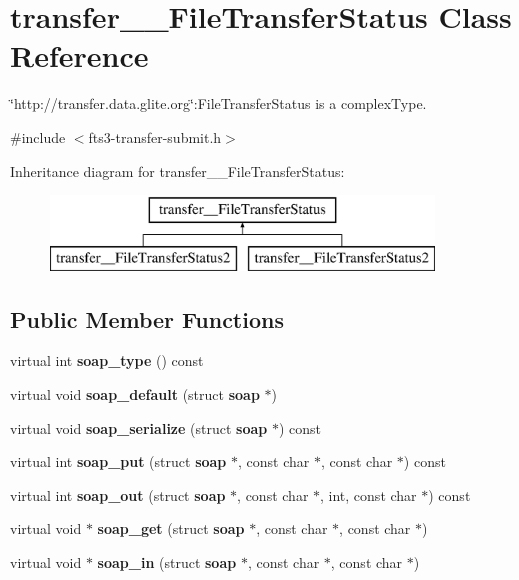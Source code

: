 \section{transfer\_\-\_\-FileTransferStatus Class Reference}
\label{classtransfer____FileTransferStatus}


\char`\"{}http://transfer.data.glite.org\char`\"{}:FileTransferStatus is a complexType.  




{\ttfamily \#include $<$fts3-\/transfer-\/submit.h$>$}

Inheritance diagram for transfer\_\-\_\-FileTransferStatus:\begin{figure}[H]
\begin{center}
\leavevmode
\includegraphics[height=2.000000cm]{classtransfer____FileTransferStatus}
\end{center}
\end{figure}
\subsection*{Public Member Functions}
\begin{DoxyCompactItemize}
\item 
virtual int {\bfseries soap\_\-type} () const \label{classtransfer____FileTransferStatus_a642ad3383ab927add4be60c6f333598a}

\item 
virtual void {\bfseries soap\_\-default} (struct {\bf soap} $\ast$)\label{classtransfer____FileTransferStatus_a888fcc282ac6ee23e00f9a5f8ee03a97}

\item 
virtual void {\bfseries soap\_\-serialize} (struct {\bf soap} $\ast$) const \label{classtransfer____FileTransferStatus_a84c43b07cef43be53d63cd90fe18fa8c}

\item 
virtual int {\bfseries soap\_\-put} (struct {\bf soap} $\ast$, const char $\ast$, const char $\ast$) const \label{classtransfer____FileTransferStatus_adb8ca349c5e0c04e5848729f4d8dafb7}

\item 
virtual int {\bfseries soap\_\-out} (struct {\bf soap} $\ast$, const char $\ast$, int, const char $\ast$) const \label{classtransfer____FileTransferStatus_a6320b08bede2ce96dc59d3de61d95a96}

\item 
virtual void $\ast$ {\bfseries soap\_\-get} (struct {\bf soap} $\ast$, const char $\ast$, const char $\ast$)\label{classtransfer____FileTransferStatus_a8d67affe727870fea60c679ccf0207bb}

\item 
virtual void $\ast$ {\bfseries soap\_\-in} (struct {\bf soap} $\ast$, const char $\ast$, const char $\ast$)\label{classtransfer____FileTransferStatus_aee03aa44cbdbf4606d21109433facaae}

\end{DoxyCompactItemize}
